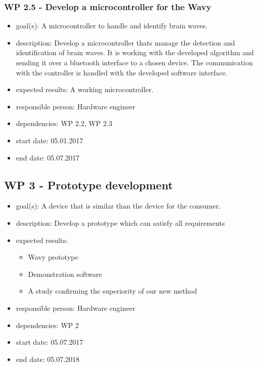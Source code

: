 \subsubsection*{WP 2.5 - Develop a microcontroller for the Wavy}
\begin{itemize}
 \item goal(s): A microcontroller to handle and identify brain waves.
 \item description: Develop a microcontroller thats manage the detection and identification of brain waves. It is working with the developed algorithm and sending it over a bluetooth interface to a chosen device. The communication with the controller is handled with the developed software interface.
 \item expected results: A working microcontroller.
 \item responsible person: Hardware engineer
 \item dependencies: WP 2.2, WP 2.3
 \item start date: 05.01.2017
 \item end date: 05.07.2017
\end{itemize}

\subsection*{WP 3 - Prototype development}
\begin{itemize}
 \item goal(s): A device that is similar than the device for the consumer.
 \item description: Develop a prototype which can satisfy all requirements
 \item expected results:
 \begin{itemize}
  \item Wavy prototype
  \item Demonstration software
  \item A study confirming the superiority of our new method
 \end{itemize}
 \item responsible person: Hardware engineer
 \item dependencies: WP 2
 \item start date: 05.07.2017
 \item end date: 05.07.2018
\end{itemize}


